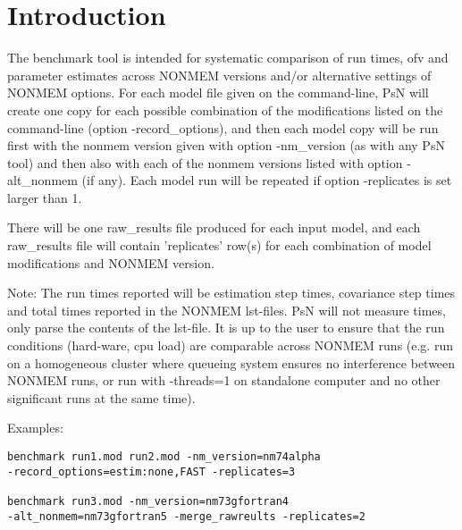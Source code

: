 




\maketitle
\newcommand{\guidetoolname}{benchmark}


\section{Introduction}
The benchmark tool is intended for systematic comparison of run times, ofv and parameter estimates
across NONMEM versions and/or alternative settings of NONMEM options.
For each model file given on the command-line, PsN will create one copy for each possible combination
of the modifications listed on the command-line (option -record\_options), and
then each model copy will be run first with the nonmem version given
with option -nm\_version (as with any PsN tool) and then also with
each of the nonmem versions listed with option -alt\_nonmem (if any).
Each model run will be repeated if option -replicates is set larger than 1.

There will be one raw\_results file produced for each input model, and each raw\_results file will contain 
'replicates' row(s)
for each combination of model modifications and NONMEM version. 

Note: The run times reported will be estimation step times, covariance step times and total times reported in the NONMEM lst-files.
PsN will not measure times, only parse the contents of the lst-file. It is up to the user to ensure that the run conditions 
(hard-ware, cpu load) are comparable across NONMEM runs (e.g. run on a homogeneous cluster where queueing system ensures 
no interference between NONMEM runs, or run with -threads=1 on standalone computer and no other significant runs at the same time).

Examples:
\begin{verbatim}
benchmark run1.mod run2.mod -nm_version=nm74alpha 
-record_options=estim:none,FAST -replicates=3

benchmark run3.mod -nm_version=nm73gfortran4 
-alt_nonmem=nm73gfortran5 -merge_rawreults -replicates=2
\end{verbatim}

